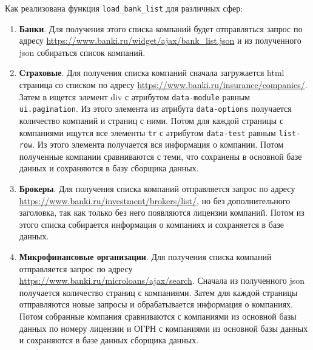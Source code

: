 \documentclass[PI, VKR]{HSEUniversity}
\begin{document}
Как реализована функция \texttt{load\_bank\_list} для различных сфер:
\begin{enumerate}
\item \textbf{Банки}. Для получения этого списка компаний будет отправляться запрос по адресу \url{https://www.banki.ru/widget/ajax/bank\_list.json} и из полученного json собираться список компаний.
\item \textbf{Страховые}. Для получения списка компаний сначала загружается html страница со списком по адресу \url{https://www.banki.ru/insurance/companies/}. Затем в ищется элемент div с атрибутом \texttt{data-module} равным \texttt{ui.pagination}. Из этого элемента из атрибута \texttt{data-options} получается количество компаний и страниц с ними. Потом для каждой страницы с компаниями ищутся все элементы \texttt{tr} с атрибутом \texttt{data-test} равным \texttt{list-row}. Из этого элемента получается вся информация о компании. Потом полученные компании сравниваются с теми, что сохранены в основной базе данных и сохраняются в базу сборщика данных.
\item \textbf{Брокеры}. Для получения списка компаний отправляется запрос по адресу \url{https://www.banki.ru/investment/brokers/list/}, но без дополнительного заголовка, так как только без него появляются лицензии компаний. Потом из этого списка собирается информация о компаниях и сохраняется в базе данных.
\item \textbf{Микрофинансовые организации}. Для получения списка компаний отправляется запрос по адресу \url{https://www.banki.ru/microloans/ajax/search}. Сначала из полученного json получается количество страниц с компаниями. Затем для каждой страницы отправляются новые запросы и обрабатывается информация о компаниях. Потом собранные компания сравниваются с компаниями из основной базы данных по номеру лицензии и ОГРН с компаниями из основной базы данных и сохраняются в базе данных сборщика данных.
\end{enumerate}
\end{document}
